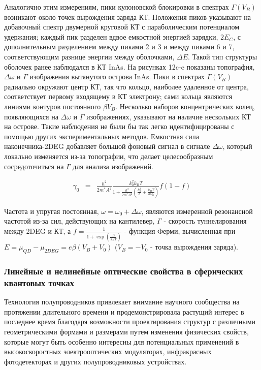 \documentclass[a4paper,14pt]{extarticle}
\begin{document}
Аналогично этим измерениям, пики кулоновской блокировки в спектрах $\Gamma(V_B)$ возникают около точек вырождения заряда КТ. Положения пиков указывают на добавочный спектр двумерной круговой КТ с параболическим потенциалом удержания; каждый пик разделен вдвое емкостной энергией зарядки, $2E_C$, с дополнительным разделением между пиками 2 и 3 и между пиками 6 и 7, соответствующим разнице энергии между оболочками, $\Delta E$. Такой тип структуры оболочек ранее наблюдался в КТ InAs. На рисунках 12c-e показаны топография, $\Delta \omega$ и $\Gamma$ изображения вытянутого острова InAs. Пики в спектрах $\Gamma(V_B)$ радиально окружают центр КТ, так что кольцо, наиболее удаленное от центра, соответствует первому входящему в КТ электрону; сами кольца являются линиями контуров постоянного $\beta V_B$. Несколько наборов концентрических колец, появляющихся на $\Delta \omega$ и $\Gamma$ изображениях, указывают на наличие нескольких КТ на острове. Такие наблюдения не были бы так легко идентифицированы с помощью других экспериментальных методов. Емкостная сила наконечника-2DEG добавляет большой фоновый сигнал в сигнале $\Delta \omega$, который локально изменяется из-за топографии, что делает целесообразным сосредоточиться на $\Gamma$ для анализа изображений.

\begin{eqnarray}
    \gamma_0 &=& \frac{\hbar^2}{2m^*A^2}\frac{k_0^2k_BT}{1+\frac{\hbar^2}{2m^*A^2}\left(\frac{k_0^2}{3}+\frac{k_BT}{\hbar\omega_0}\right)}f(1-f)
    \end{eqnarray}

Частота и упругая постоянная, $\omega = \omega_0 + \Delta \omega$, являются измеренной резонансной частотой из-за сил, действующих на кантилевер, $\Gamma$ - скорость туннелирования между 2DEG и КТ, а $f = \frac{1}{1 + \exp\left(\frac{E}{k_B T}\right)}$ - функция Ферми, вычисленная при $E = \mu_{QD} - \mu_{2DEG} = e\beta(V_B + V_0)$ ($V_B = -V_0$ - точка вырождения заряда).

\subsubsection{Линейные и нелинейные оптические свойства в сферических квантовых точках}

Технология полупроводников привлекает внимание научного сообщества на протяжении длительного времени и продемонстрировала растущий интерес в последнее время благодаря возможности проектирования структур с различными геометрическими формами и размерами путем изменения физических свойств, которые могут быть особенно интересны для потенциальных применений в высокоскоростных электрооптических модуляторах, инфракрасных фотодетекторах и других полупроводниковых устройствах.\cite{mathe}
\end{document}
